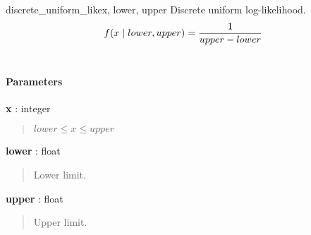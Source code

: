 \hypertarget{pymc.distributions.discrete_uniform_like}{}
\begin{funcdesc}{discrete\_uniform\_like}{x, lower, upper}
Discrete uniform log-likelihood.
\begin{gather}
\begin{split}f(x \mid lower, upper) = \frac{1}{upper-lower}\end{split}\notag\\\begin{split}\end{split}\notag
\end{gather}
\paragraph{Parameters}
\begin{paramlist}
\item[] \textbf{x} : integer
\begin{quote}

$lower \leq x \leq upper$
\end{quote}

\item[] \textbf{lower} : float
\begin{quote}

Lower limit.
\end{quote}

\item[] \textbf{upper} : float
\begin{quote}

Upper limit.
\end{quote}
\end{paramlist}
\end{funcdesc}



